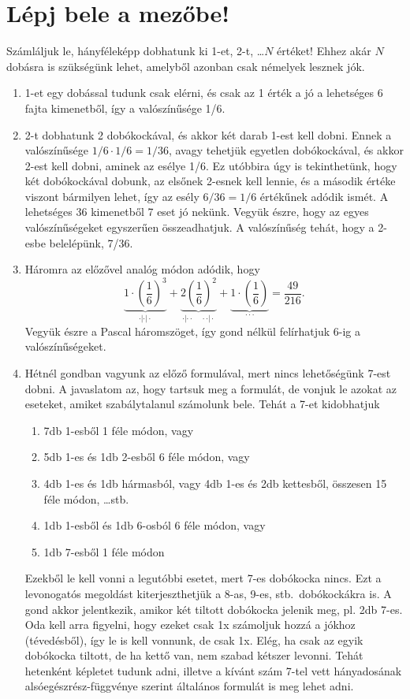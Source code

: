 \documentclass[12pt,a4paper]{article}
\begin{document}
\section{Lépj bele a mezőbe!}
Számláljuk le, hányféleképp dobhatunk ki 1-et, 2-t, \ldots $N$ értéket! Ehhez akár $N$ dobásra is szükségünk lehet, amelyből azonban csak némelyek lesznek jók.
\begin{enumerate}
  \item 1-et egy dobással tudunk csak elérni, és csak az 1 érték a jó a lehetséges 6 fajta kimenetből, így a valószínűsége 1/6.
  \item 2-t dobhatunk 2 dobókockával, és akkor két darab 1-est kell dobni. Ennek a valószínűsége $1/6 \cdot 1/6 = 1/36$, avagy tehetjük egyetlen dobókockával, és akkor 2-est kell dobni, aminek az esélye 1/6. Ez utóbbira úgy is tekinthetünk, hogy két dobókockával dobunk, az elsőnek 2-esnek kell lennie, és a második értéke viszont bármilyen lehet, így az esély $6/36 = 1/6$ értékűnek adódik ismét. A lehetséges 36 kimenetből 7 eset jó nekünk. Vegyük észre, hogy az egyes valószínűségeket egyszerűen összeadhatjuk. A valószínűség tehát, hogy a 2-esbe belelépünk, 7/36.
  \item Háromra az előzővel analóg módon adódik, hogy \[\underbrace {1 \cdot {{\left( {\frac{1}{6}} \right)}^3}}_{ \cdot | \cdot | \cdot } + \underbrace {2{{\left( {\frac{1}{6}} \right)}^2}}_{ \cdot | \cdot  \cdot \quad  \cdot  \cdot | \cdot } + \underbrace {1 \cdot \left( {\frac{1}{6}} \right)}_{ \cdot  \cdot  \cdot } = \frac{{49}}{{216}}.\] Vegyük észre a Pascal háromszöget, így gond nélkül felírhatjuk 6-ig a valószínűségeket.
  \item Hétnél gondban vagyunk az előző formulával, mert nincs lehetőségünk 7-est dobni. A javaslatom az, hogy tartsuk meg a formulát, de vonjuk le azokat az eseteket, amiket szabálytalanul számolunk bele. Tehát a 7-et kidobhatjuk
        \begin{enumerate}
          \item 7db 1-esből 1 féle módon, vagy
          \item 5db 1-es és 1db 2-esből 6 féle módon, vagy
          \item 4db 1-es és 1db hármasból, vagy 4db 1-es és 2db kettesből, összesen 15 féle módon, \ldots stb.
          \item 1db 1-esből és 1db 6-osból 6 féle módon, vagy
          \item 1db 7-esből 1 féle módon
        \end{enumerate}
        Ezekből le kell vonni a legutóbbi esetet, mert 7-es dobókocka nincs. Ezt a levonogatós megoldást kiterjeszthetjük a 8-as, 9-es, stb.\ dobókockákra is. A gond akkor jelentkezik, amikor két tiltott dobókocka jelenik meg, pl. 2db 7-es. Oda kell arra figyelni, hogy ezeket csak 1x számoljuk hozzá a jókhoz (tévedésből), így le is kell vonnunk, de csak 1x. Elég, ha csak az egyik dobókocka tiltott, de ha kettő van, nem szabad kétszer levonni. Tehát hetenként képletet tudunk adni, illetve a kívánt szám 7-tel vett hányadosának alsóegészrész-függvénye szerint általános formulát is meg lehet adni.

\end{enumerate}
\end{document}
